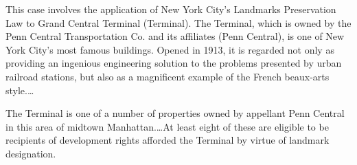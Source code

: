 
This case involves the application of New York City's Landmarks Preservation Law
to Grand Central Terminal (Terminal). The Terminal, which is owned by the Penn
Central Transportation Co. and its affiliates (Penn Central), is one of New York
City's most famous buildings. Opened in 1913, it is regarded not only as
providing an ingenious engineering solution to the problems presented by urban
railroad stations, but also as a magnificent example of the French beaux-arts
style.\ldots


The
Terminal is one of a number of properties owned by appellant Penn Central in
this area of midtown Manhattan.\ldots At least eight of these are eligible to be
recipients of development rights afforded the Terminal by virtue of landmark
designation.


